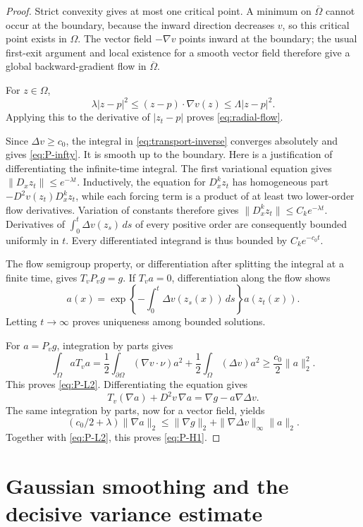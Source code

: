 \documentclass[11pt]{article}
\theoremstyle{remark}
\begin{document}
\begin{proof}
Strict convexity gives at most one critical point. A minimum on
\(\overline\Omega\) cannot occur at the boundary, because the inward
direction decreases \(v\), so this critical point exists in \(\Omega\).
The vector field \(-\nabla v\) points inward at the boundary;
the usual first-exit argument and local existence for a smooth
vector field therefore give a global backward-gradient flow in
\(\overline\Omega\).

For \(z\in\Omega\),
\[
\lambda|z-p|^2
\leq (z-p)\cdot\nabla v(z)
\leq\Lambda|z-p|^2.
\]
Applying this to the derivative of \(|z_t-p|\) proves
\eqref{eq:radial-flow}.

Since \(\Delta v\geq c_0\), the integral in
\eqref{eq:transport-inverse} converges absolutely and gives
\eqref{eq:P-infty}. It is smooth up to the boundary. Here is a
justification of differentiating the infinite-time integral.
The first variational equation gives
\(\|D_xz_t\|\leq e^{-\lambda t}\).
Inductively, the equation for \(D_x^kz_t\) has homogeneous part
\(-D^2v(z_t)D_x^kz_t\), while each forcing term is a product of
at least two lower-order flow derivatives. Variation of constants
therefore gives
\(\|D_x^kz_t\|\leq C_ke^{-\lambda t}\).
Derivatives of \(\int_0^t\Delta v(z_s)\,ds\) of every positive
order are consequently bounded uniformly in \(t\).
Every differentiated integrand is thus bounded by \(C_ke^{-c_0t}\).

The flow semigroup property, or differentiation after splitting the
integral at a finite time, gives \(T_vP_vg=g\).
If \(T_va=0\), differentiation along the flow shows
\[
a(x)=
\exp\left\{-\int_0^t\Delta v(z_s(x))\,ds\right\}a(z_t(x)).
\]
Letting \(t\to\infty\) proves uniqueness among bounded solutions.

For \(a=P_vg\), integration by parts gives
\[
\int_\Omega aT_va
=
\frac12\int_{\partial\Omega}(\nabla v\cdot\nu)a^2
+\frac12\int_\Omega(\Delta v)a^2
\geq\frac{c_0}{2}\|a\|_2^2.
\]
This proves \eqref{eq:P-L2}. Differentiating the equation gives
\[
T_v(\nabla a)+D^2v\,\nabla a
=\nabla g-a\nabla\Delta v.
\]
The same integration by parts, now for a vector field, yields
\[
(c_0/2+\lambda)\|\nabla a\|_2
\leq\|\nabla g\|_2+\|\nabla\Delta v\|_\infty\|a\|_2.
\]
Together with \eqref{eq:P-L2}, this proves \eqref{eq:P-H1}.
\end{proof}

\section{Gaussian smoothing and the decisive variance estimate}
\end{document}
